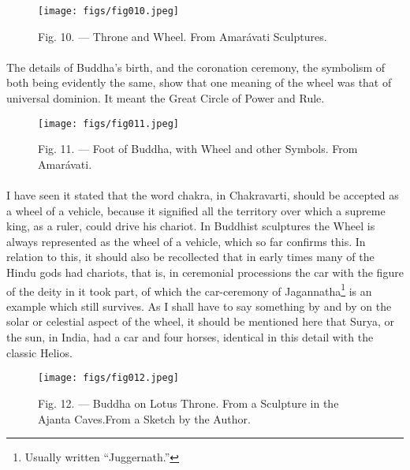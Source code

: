 \documentclass[a4paper, 11pt, oneside, polutonikogreek, english]{article}
\begin{document}
\begin{figure}[H]
\centering
\texttt{[image: figs/fig010.jpeg]}
\caption[Fig. 10. --- Throne and Wheel.]{Fig. 10. --- Throne and Wheel. From Amarávati Sculptures.}
\end{figure}
\paragraph{}
The details of Buddha's birth, and the coronation ceremony, the symbolism of both being evidently the same, show that one meaning of the wheel was that of universal dominion. It meant the Great Circle of Power and Rule.

\begin{figure}[H]
\centering
\texttt{[image: figs/fig011.jpeg]}
\caption[Fig. 11. --- Foot of Buddha, with Wheel and other Symbols.]{Fig. 11. --- Foot of Buddha, with Wheel and other Symbols. From Amarávati.}
\end{figure}
\paragraph{}
I have seen it stated that the word chakra, in Chakravarti, should be accepted as a wheel of a vehicle, because it signified all the territory over which a supreme king, as a ruler, could drive his chariot. In Buddhist sculptures the Wheel is always represented as the wheel of a vehicle, which so far confirms this. In relation to this, it should also be recollected that in early times many of the Hindu gods had chariots, that is, in ceremonial processions the car with the figure of the deity in it took part, of which the car-ceremony of Jagannatha\footnote{Usually written ``Juggernath.''} is an example which still survives. As I shall have to say something by and by on the solar or celestial aspect of the wheel, it should be mentioned here that Surya, or the sun, in India, had a car and four horses, identical in this detail with the classic Helios.

\begin{figure}[H]
\centering
\texttt{[image: figs/fig012.jpeg]}
\caption[Fig. 12. --- Buddha on Lotus Throne.]{Fig. 12. --- Buddha on Lotus Throne. From a Sculpture in the Ajanta Caves.\footnotemark From a Sketch by the Author.}
\end{figure}
\end{document}
